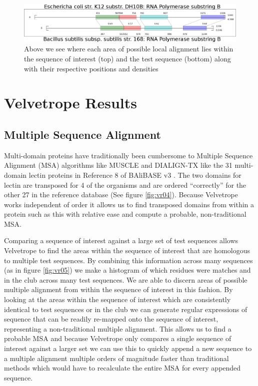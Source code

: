 \documentclass[phd,tocprelim]{cornell}
\begin{document}
 \begin{figure}[htp]%
 \centerline{\includegraphics[width=\textwidth]{figures/velvetrope/localAlignmentsBreakout.png}}
 \caption[Local alignments]{Above we see where each area of possible local alignment lies within the sequence of interest (top) and the test sequence (bottom) along with their respective positions and densities}
 	\label{fig:vr03}
 \end{figure}


\chapter{Velvetrope Results} %
\label{cha:Velvetrope Results}

\section{Multiple Sequence Alignment}

Multi-domain proteins have traditionally been cumbersome to Multiple Sequence Alignment (MSA) algorithms like MUSCLE \cite{MUSCLE} and DIALIGN-TX \cite{DIALIGN-TX} like the 31 multi-domain lectin proteins in Reference 8 of BAliBASE v3 \cite{Balibase}. The two domains for lectin are transposed for 4 of the organisms and are ordered ``correctly'' for the other 27 in the reference database (See figure \ref{fig:vr04}). Because Velvetrope works independent of order it allows us to find transposed domains from within a protein such as this with relative ease and compute a probable, non-traditional MSA.

Comparing a sequence of interest against a large set of test sequences allows Velvetrope to find the areas within the sequence of interest that are homologous to multiple test sequences. By combining this information across many sequences (as in figure \ref{fig:vr05}) we make a histogram of which residues were matches and in the club across many test sequences. We are able to discern areas of possible multiple alignment from within the sequence of interest in this fashion. By looking at the areas within the sequence of interest which are consistently identical to test sequences or in the club we can generate regular expressions of sequence that can be readily re-mapped onto the sequence of interest, representing a non-traditional multiple alignment.  This allows us to find a probable MSA and because Velvetrope only compares a single sequence of interest against a larger set we can use this to quickly append a new sequence to a multiple alignment multiple orders of magnitude faster than traditional methods which would have to recalculate the entire MSA for every appended sequence.
\end{document}
